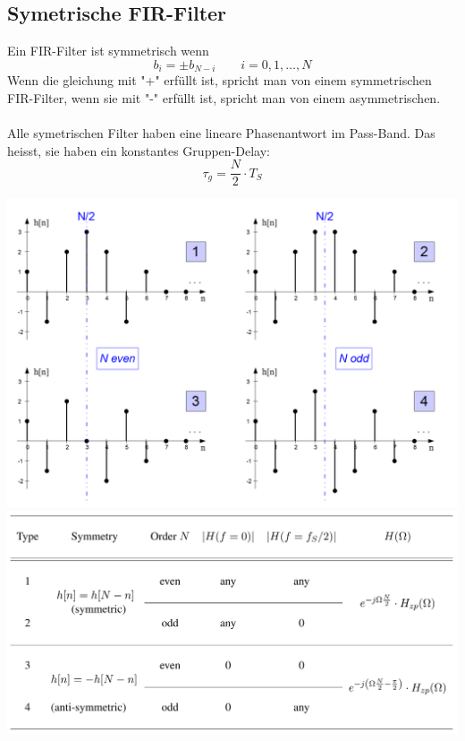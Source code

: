 \subsection{Symetrische FIR-Filter}
Ein FIR-Filter ist symmetrisch wenn
\[ b_i = \pm b_{N-i} \qquad i = 0,1,\ldots,N \]
Wenn die gleichung mit "+" erfüllt ist, spricht man von einem symmetrischen 
FIR-Filter, wenn sie mit "-" erfüllt ist, spricht man von einem asymmetrischen.\\
\\
Alle symetrischen Filter haben eine lineare Phasenantwort im Pass-Band. Das
heisst, sie haben ein konstantes Gruppen-Delay:
\[ \tau_g = \frac{N}{2} \cdot T_S \]

\begin{center}
	\includegraphics[scale=.7]{../fig/fir_filter}
	\includegraphics[scale=.7]{../fig/fir_table}
\end{center}

